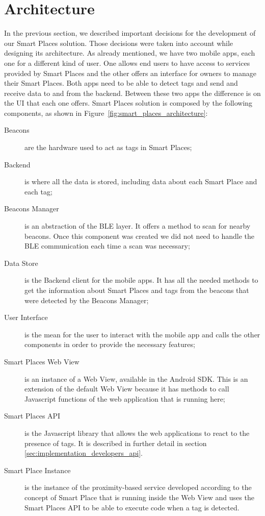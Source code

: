 \section{Architecture}
\label{sec:implementation_architecture}
In the previous section, we described important decisions for the development of our Smart Places solution. Those decisions were taken into account while designing its architecture.
As already mentioned, we have two mobile apps, each one for a different kind of user.
One allows end users to have access to services provided by Smart Places and the other offers an interface for owners to manage their Smart Places.
Both apps need to be able to detect tags and send and receive data to and from the backend.
Between these two apps the difference is on the \gls{UI} that each one offers.
Smart Places solution is composed by the following components, as shown in Figure~\ref{fig:smart_places_architecture}:
\begin{description}
  \item[Beacons]
  are the hardware used to act as tags in Smart Places;
  \item[Backend]
  is where all the data is stored, including data about each Smart Place and each tag;
  \item[Beacons Manager]
  is an abstraction of the \gls{BLE} layer.
  It offers a method to scan for nearby beacons. Once this component was created we did not need to handle the \gls{BLE} communication each time a scan was necessary;
  \item[Data Store]
  is the Backend client for the mobile apps.
  It has all the needed methods to get the information about Smart Places and tags from the beacons that were detected by the Beacons Manager;
  \item[User Interface]
  is the mean for the user to interact with the mobile app and calls the other components in order to provide the necessary features;
  \item[Smart Places Web View]
  is an instance of a Web View, available in the Android \gls{SDK}.
  This is an extension of the default Web View because it has methods to call Javascript functions of the web application that is running here;
  \item[Smart Places \gls{API}]
  is the Javascript library that allows the web applications to react to the presence of tags.
  It is described in further detail in section \ref{sec:implementation_developers_api}.
  \item[Smart Place Instance]
  is the instance of the proximity-based service developed according to the concept of Smart Place that is running inside the Web View and uses the Smart Places \gls{API} to be able to execute code when a tag is detected.
\end{description}

